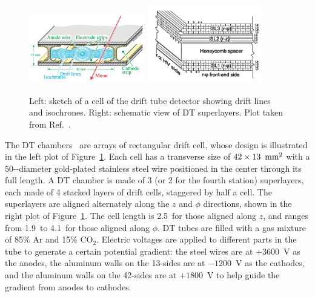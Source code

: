 \begin{figure}[!htb]
    \centering
    \captionsetup{justification=justified}
    \includegraphics[width=0.45\textwidth]{pics/LHC_CMS/DT.png}
    \includegraphics[width=0.45\textwidth]{pics/LHC_CMS/DT_superlayer.png}
    \caption{Left: sketch of a cell of the drift tube detector showing drift lines and isochrones.
             Right: schematic view of DT superlayers.
             Plot taken from Ref.~\cite{collaboration_2013}.}
    \label{fig:cms_dt}
\end{figure}

The DT chambers~\cite{Collaboration_2008, collaboration_2013} are arrays of rectangular drift cell, whose design is illustrated in the left plot of Figure~\ref{fig:cms_dt}.
Each cell has a transverse size of $42 \times 13~\,\text{mm}^{2}$ with a 50-\mum-diameter 
gold-plated stainless steel wire positioned in the center through its full length.
A DT chamber is made of 3 (or 2 for the fourth station) superlayers, each made of 4 stacked layers of drift cells, staggered by half a cell.
The superlayers are aligned alternately along the $z$ and $\phi$ directions, shown in the right plot of Figure~\ref{fig:cms_dt}.
The cell length is 2.5~\meter for those aligned along $z$, and ranges from 1.9~\meter to 4.1~\meter for those aligned along $\phi$.
DT tubes are filled with a gas mixture of 85\% Ar and 15\% $\text{CO}_{2}$.
Electric voltages are applied to different parts in the tube to generate a certain potential gradient:
the steel wires are at $+3600$~V as the anodes, the aluminum walls on the 13-\mm sides are at $-1200$~V as the cathodes,
and the aluminum walls on the 42-\mm sides are at $+1800$~V to help guide the gradient from anodes to cathodes.

